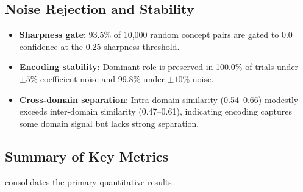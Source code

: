 \documentclass[11pt,a4paper]{article}
\begin{document}
\subsection{Noise Rejection and Stability}

\begin{itemize}[nosep]
\item \textbf{Sharpness gate}: 93.5\% of 10,000 random concept pairs are
  gated to 0.0 confidence at the 0.25 sharpness threshold.
\item \textbf{Encoding stability}: Dominant role is preserved in 100.0\% of
  trials under $\pm5\%$ coefficient noise and 99.8\% under $\pm10\%$ noise.
\item \textbf{Cross-domain separation}: Intra-domain similarity (0.54--0.66)
  modestly exceeds inter-domain similarity (0.47--0.61), indicating encoding
  captures some domain signal but lacks strong separation.
\end{itemize}

\subsection{Summary of Key Metrics}

 consolidates the primary quantitative results.
\end{document}
